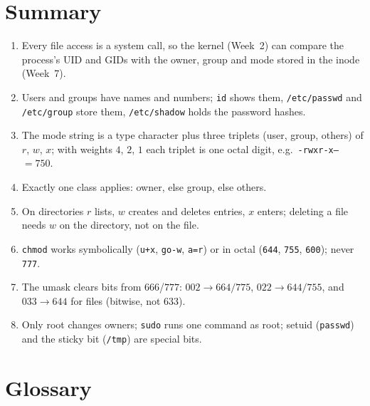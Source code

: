 \documentclass[11pt,a4paper]{article}
\newcommand{\cmd}[1]{\texttt{#1}}
\begin{document}
\section{Summary}

\begin{keyidea}
\begin{enumerate}[leftmargin=1.4em]
  \item Every file access is a system call, so the kernel (Week~2) can compare the process's UID and GIDs with the owner, group and mode stored in the inode (Week~7).
  \item Users and groups have names and numbers; \cmd{id} shows them, \texttt{/etc/passwd} and \texttt{/etc/group} store them, \texttt{/etc/shadow} holds the password hashes.
  \item The mode string is a type character plus three triplets (user, group, others) of $r$, $w$, $x$; with weights $4$, $2$, $1$ each triplet is one octal digit, e.g.\ \texttt{-rwxr-x---} $= 750$.
  \item Exactly one class applies: owner, else group, else others.
  \item On directories $r$ lists, $w$ creates and deletes entries, $x$ enters; deleting a file needs $w$ on the directory, not on the file.
  \item \cmd{chmod} works symbolically (\texttt{u+x}, \texttt{go-w}, \texttt{a=r}) or in octal (\texttt{644}, \texttt{755}, \texttt{600}); never \texttt{777}.
  \item The umask clears bits from $666$/$777$: $002 \to 664/775$, $022 \to 644/755$, and $033 \to 644$ for files (bitwise, not $633$).
  \item Only root changes owners; \cmd{sudo} runs one command as root; setuid (\cmd{passwd}) and the sticky bit (\texttt{/tmp}) are special bits.
\end{enumerate}
\end{keyidea}

\section{Glossary}
\end{document}

